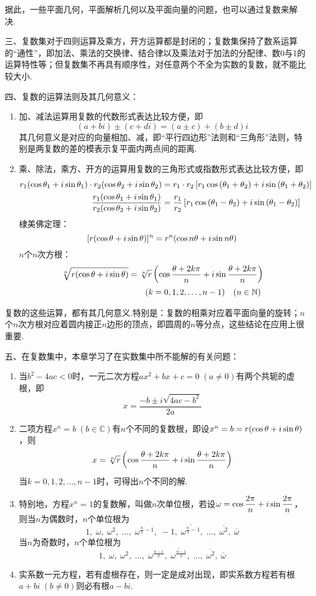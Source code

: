 据此，一些平面几何，平面解析几何以及平面向量的问题，也可以通过复数来解决.

三、复数集对于四则运算及乘方，开方运算都是封闭的；复数集保持了数系运算的“通性”，即加法、乘法的交换律、结合律以及乘法对于加法的分配律、数0与1的运算特性等；但复数集不再具有顺序性，对任意两个不全为实数的复数，就不能比较大小.

四、复数的运算法则及其几何意义：
\begin{enumerate}
    \item 加、减法运算用复数的代数形式表达比较方便，即
    \[(a+bi)\pm (c+di)=(a\pm c)+(b\pm d)i\]
    其几何意义是对应的向量相加、减，即“平行四边形”法则和“三角形”法则，特别是两复数的差的模表示复平面内两点间的距离.
    \item 乘、除法，乘方、开方的运算用复数的三角形式或指数形式表达比较方便，即
\[\begin{split}
    r_1(\cos{\theta_1}+i\sin{\theta_1})\cdot r_2(\cos{\theta_2}+i\sin{\theta_2})&=r_1\cdot r_2\left[r_1\cos\left(\theta_1+\theta_2\right)+i\sin\left(\theta_1+\theta_2\right)\right]\\
\dfrac{r_1(\cos{\theta_1}+i\sin{\theta_1})}{r_2(\cos{\theta_2}+i\sin{\theta_2})}&=\dfrac{r_1}{r_2}\left[r_1\cos\left(\theta_1-\theta_2\right)+i\sin\left(\theta_1-\theta_2\right)\right]
\end{split}\]
棣美佛定理：
\[[r(\cos{\theta}+i\sin{\theta})]^n=r^n(\cos{n\theta}+i\sin{n\theta})\]
$n$个$n$次方根：
\[\begin{split}
\sqrt[n]{r(\cos{\theta}+i\sin{\theta})}&=\sqrt[n]{r}\left(\cos{\dfrac{\theta+2k\pi}{n}}+i\sin{\dfrac{\theta+2k\pi}{n}}\right)\\
&\qquad (k=0,1,2,\ldots,n-1)\quad (n\in\mathbb{N})    
\end{split} \]
\end{enumerate}

复数的这些运算，都有其几何意义.特别是：复数的相乘对应着平面向量的旋转；$n$个$n$次方根对应着圆内接正$n$边形的顶点，即圆周的$n$等分点，这些结论在应用上很重要.

五、在复数集中，本章学习了在实数集中所不能解的有关问题：
\begin{enumerate}
    \item 当$b^2-4ac<0$时，一元二次方程$ax^2+bx+c=0\; (a\ne 0)$有两个共轭的虚根，即
\[x=\frac{-b\pm i\sqrt{4ac-b^2}}{2a}\]
\item 二项方程$x^n=b\; (b\in\mathbb{C})$有$n$个不同的复数根，即设$x^n=b=r(\cos{\theta}+i\sin{\theta})$，则
\[x=\sqrt[n]{r}\left(\cos{\dfrac{\theta+2k\pi}{n}}+i\sin{\dfrac{\theta+2k\pi}{n}}\right)\]
当$k=0,1,2,\ldots,n-1$时，可得出$n$个不同的解.

\item 特别地，方程$x^n=1$的复数解，叫做$n$次单位根，若设$\omega=\cos{\dfrac{2\pi}{n}}+i\sin{\dfrac{2\pi}{n}}$，则当$n$为偶数时，$n$个单位根为
\[1,\; \omega,\; \omega^2,\;\ldots,\;  \omega^{\tfrac{n}{2}-1},\;-1,\;  \overline{\omega^{\tfrac{n}{2}-1}},\; \ldots, \;  \overline{\omega^{2}},\; \overline{\omega}\]
当$n$为奇数时，$n$个单位根为
\[1,\; \omega,\; \omega^2,\;\ldots,\;  \omega^{\tfrac{n-1}{2}},\;  \overline{\omega^{\tfrac{n-1}{2}}},\; \ldots, \;  \overline{\omega^{2}},\; \overline{\omega}\]

\item 实系数一元方程，若有虚根存在，则一定是成对出现，即实系数方程若有根$a+bi\;(b\ne 0)$则必有根$a-bi$.
\end{enumerate}

